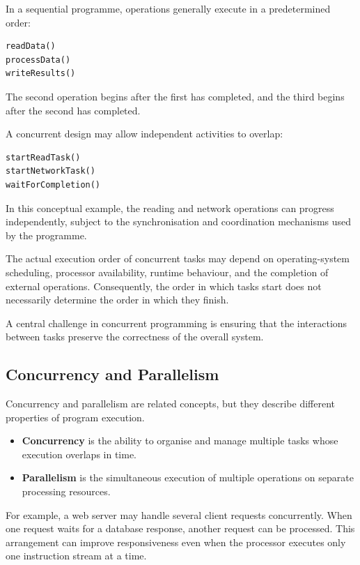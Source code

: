 In a sequential programme, operations generally execute in a predetermined order:

\begin{lstlisting}
readData()
processData()
writeResults()
\end{lstlisting}

The second operation begins after the first has completed, and the third begins after the second has completed.

A concurrent design may allow independent activities to overlap:

\begin{lstlisting}
startReadTask()
startNetworkTask()
waitForCompletion()
\end{lstlisting}

In this conceptual example, the reading and network operations can progress independently, subject to the synchronisation and coordination mechanisms used by the programme.

The actual execution order of concurrent tasks may depend on operating-system scheduling, processor availability, runtime behaviour, and the completion of external operations. Consequently, the order in which tasks start does not necessarily determine the order in which they finish.

A central challenge in concurrent programming is ensuring that the interactions between tasks preserve the correctness of the overall system.

\subsection{Concurrency and Parallelism}

Concurrency and parallelism are related concepts, but they describe different properties of program execution.

\begin{itemize}
    \item \textbf{Concurrency} is the ability to organise and manage multiple tasks whose execution overlaps in time.
    \item \textbf{Parallelism} is the simultaneous execution of multiple operations on separate processing resources.
\end{itemize}

For example, a web server may handle several client requests concurrently. When one request waits for a database response, another request can be processed. This arrangement can improve responsiveness even when the processor executes only one instruction stream at a time.


